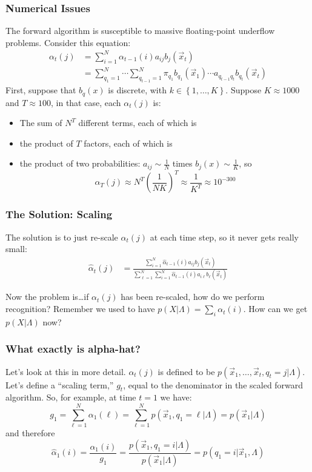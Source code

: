 \documentclass{beamer}
\begin{document}
\begin{frame}
  \frametitle{Numerical Issues}

  The forward algorithm is susceptible to massive floating-point
  underflow problems. Consider this equation:
  \begin{align*}
    \alpha_{t}(j) &= \sum_{i=1}^N \alpha_{t-1}(i) a_{ij}b_j(\vec{x}_t)\\
    &= \sum_{q_1=1}^N\cdots\sum_{q_{t-1}=1}^N \pi_{q_1}b_{q_1}(\vec{x}_1)\cdots
    a_{q_{t-1}q_{t}}b_{q_t}(\vec{x}_t)
  \end{align*}
  First, suppose that $b_q(x)$ is discrete, with
  $k\in\left\{1,\ldots,K\right\}$.  Suppose $K\approx 1000$ and
  $T\approx 100$, in that case, each $\alpha_t(j)$ is:
  \begin{itemize}
  \item The sum of $N^T$ different terms, each of which is
  \item the product of $T$ factors, each of which is
  \item the product of two probabilities: $a_{ij}\sim\frac{1}{N}$ times
    $b_j(x)\sim\frac{1}{K}$, so
    \begin{displaymath}
      \alpha_T(j) \approx N^T\left(\frac{1}{NK}\right)^{T} \approx \frac{1}{K^T}\approx 10^{-300}
    \end{displaymath}
  \end{itemize}
\end{frame}

\begin{frame}
  \frametitle{The Solution: Scaling}

  The solution is to just re-scale $\alpha_t(j)$ at each time step, so
  it never gets really small:
  \begin{align*}
    \hat\alpha_{t}(j) &=
    \frac{\sum_{i=1}^N \hat\alpha_{t-1}(i) a_{ij}b_j(\vec{x}_t)}
         {\sum_{\ell=1}^N\sum_{i=1}^N \hat\alpha_{t-1}(i) a_{i\ell}b_\ell(\vec{x}_t)}
  \end{align*}

  Now the problem is\ldots if $\alpha_t(j)$ has been re-scaled, how do
  we perform recognition?  Remember we used to have
  $p(X|\Lambda)=\sum_i\alpha_t(i)$.  How can we get $p(X|\Lambda)$
  now?
\end{frame}

\begin{frame}
  \frametitle{What exactly is alpha-hat?}

  Let's look at this in more detail.  $\alpha_t(j)$ is defined to be
  $p(\vec{x}_1,\ldots,\vec{x}_t,q_t=j|\Lambda)$.  Let's define a
  ``scaling term,'' $g_t$, equal to the denominator in the scaled
  forward algorithm.  So, for example, at time $t=1$ we have:
  \begin{displaymath}
  g_1 = \sum_{\ell=1}^N \alpha_1(\ell)= \sum_{\ell=1}^N p(\vec{x}_1,q_1=\ell|\Lambda)
  = p(\vec{x}_1|\Lambda)
  \end{displaymath}
  and therefore
  \begin{displaymath}
  \hat\alpha_1(i) = \frac{\alpha_1(i)}{g_1} 
  = \frac{p(\vec{x}_1,q_1=i|\Lambda)}{p(\vec{x}_1|\Lambda)}
  = p(q_1=i|\vec{x}_1,\Lambda)
  \end{displaymath}
\end{frame}
\end{document}

